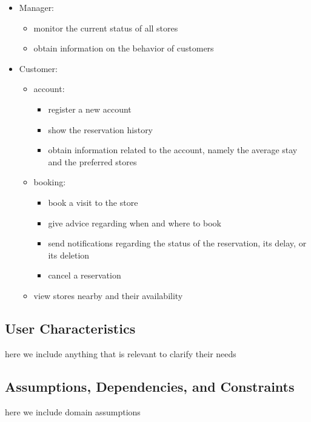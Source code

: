 \begin{itemize}
    \item Manager:
    \begin{itemize}
        \item monitor the current status of all stores
        \item obtain information on the behavior of customers
    \end{itemize}
    \item Customer:
    \begin{itemize}
        \item account:
        \begin{itemize}
            \item register a new account
            \item show the reservation history
            \item obtain information related to the account, namely the average stay and the preferred stores
        \end{itemize}
        \item booking:
        \begin{itemize}
            \item book a visit to the store
            \item give advice regarding when and where to book
            \item send notifications regarding the status of the reservation, its delay, or its deletion
            \item cancel a reservation
        \end{itemize}
        \item view stores nearby and their availability
    \end{itemize}
\end{itemize}
\subsection{User Characteristics}
here we include anything that is relevant to clarify their needs

\subsection{Assumptions, Dependencies, and Constraints}
here we include domain assumptions 